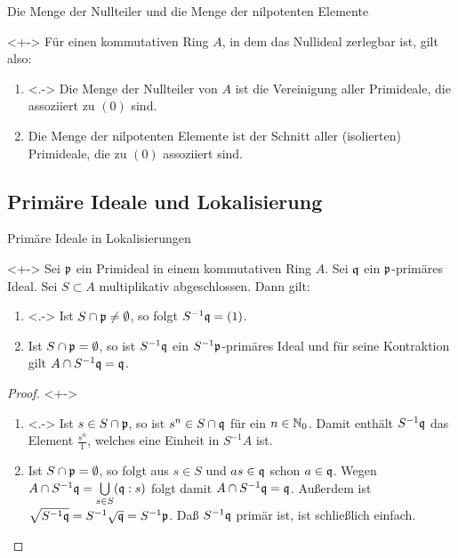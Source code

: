 \begin{frame}{Die Menge der Nullteiler und die Menge der nilpotenten Elemente}
	\begin{remark}<+->
		Für einen kommutativen Ring \(A\), in dem das Nullideal zerlegbar ist, gilt also:
		\begin{enumerate}[<+->]
		\item<.->
			Die Menge der Nullteiler von \(A\) ist die Vereinigung aller Primideale, die assoziiert zu \((0)\) sind.
		\item
			Die Menge der nilpotenten Elemente ist der Schnitt aller (isolierten) Primideale, die zu \((0)\) assoziiert sind.
		\end{enumerate}
	\end{remark}
\end{frame}

\subsection{Primäre Ideale und Lokalisierung}

\begin{frame}{Primäre Ideale in Lokalisierungen}
	\begin{proposition}<+->
		\label{prop:primaries_in_localisation}
		Sei \(\mathfrak{p}\) ein Primideal in einem kommutativen Ring \(A\). Sei \(\mathfrak{q}\) ein \(\mathfrak{p}\)-primäres Ideal.
		Sei \(S \subset A\) multiplikativ abgeschlossen. Dann gilt:
		\begin{enumerate}[<+->]
		\item<.->
			Ist \(S \cap \mathfrak{p} \neq \emptyset\), so folgt \(S^{-1} \mathfrak{q} = (1)\).
		\item
			Ist \(S \cap \mathfrak{p} = \emptyset\), so ist \(S^{-1} \mathfrak{q}\) ein \(S^{-1} \mathfrak{p}\)-primäres Ideal
			und für seine Kontraktion gilt \(A \cap S^{-1} \mathfrak{q} = \mathfrak{q}\).
		\end{enumerate}
	\end{proposition}
	\begin{proof}<+->
		\begin{enumerate}[<+->]
		\item<.->
			Ist \(s \in S \cap \mathfrak{p}\), so ist \(s^n \in S \cap \mathfrak{q}\) für ein \(n \in \mathbb N_0\). Damit enthält
			\(S^{-1} \mathfrak{q}\) das Element \(\frac{s^n} 1\), welches eine Einheit in \(S^{-1} A\) ist.
		\item
			Ist \(S \cap \mathfrak{p} = \emptyset\), so folgt aus \(s \in S\) und \(as \in \mathfrak{q}\) schon \(a \in \mathfrak{q}\).
			Wegen \(A \cap S^{-1} \mathfrak{q} = \bigcup\limits_{s \in S} (\mathfrak{q} : s)\) folgt damit \(A \cap S^{-1} \mathfrak{q}
			= \mathfrak{q}\).
			Außerdem ist \(\sqrt{S^{-1} \mathfrak{q}} = S^{-1} \sqrt{\mathfrak{q}} = S^{-1} \mathfrak{p}\). Daß \(S^{-1} \mathfrak{q}\) primär ist,
			ist schließlich einfach.
			\qedhere
		\end{enumerate}
	\end{proof}
\end{frame}

